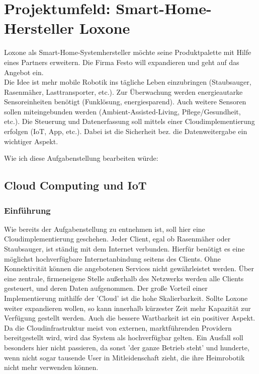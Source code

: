 \documentclass[letterpaper, 12pt]{article}
\let\tempsection\section
\renewcommand\section[1]{\vspace{-0.3cm}\tempsection{#1}\vspace{-0.3cm}}
\let\tempsubsection\subsection
\renewcommand\subsection[1]{\vspace{0cm}\tempsubsection{#1}\vspace{0cm}}
\let\tempsubsubsection\subsubsection
\renewcommand\subsubsection[1]{\vspace{0cm}\tempsubsubsection{#1}\vspace{0cm}}
\begin{document}
\clearpage

\section{Projektumfeld: Smart-Home-Hersteller Loxone}

Loxone als Smart-Home-Systemhersteller möchte seine Produktpalette mit
Hilfe eines Partners erweitern. Die Firma Festo will expandieren und
geht auf das Angebot ein. \\
Die Idee ist mehr mobile Robotik ins tägliche Leben einzubringen
(Staubsauger, Rasenmäher, Lasttransporter, etc.). Zur Überwachung werden
energieautarke Sensoreinheiten benötigt (Funklösung, energiesparend).
Auch weitere Sensoren sollen miteingebunden werden
(Ambient-Assisted-Living, Pflege/Gesundheit, etc.).
Die Steuerung und Datenerfassung soll mittels einer Cloudimplementierung
erfolgen (IoT, App, etc.).
Dabei ist die Sicherheit bez. die Datenweitergabe ein wichtiger Aspekt.

Wie ich diese Aufgabenstellung bearbeiten würde:

\subsection{Cloud Computing und IoT}

\subsubsection{Einführung}

Wie bereits der Aufgabenstellung zu entnehmen ist, soll hier eine Cloudimplementierung geschehen. Jeder Client, egal ob Rasenmäher oder Staubsauger, ist ständig mit dem Internet verbunden. Hierfür benötigt es eine möglichst hochverfügbare Internetanbindung seitens des Clients. Ohne Konnektivität können die angebotenen Services nicht gewährleistet werden. Über eine zentrale, firmeneigene Stelle außerhalb des Netzwerks werden alle Clients gesteuert, und deren Daten aufgenommen. Der große Vorteil einer Implementierung mithilfe der 'Cloud' ist die hohe Skalierbarkeit. Sollte Loxone weiter expandieren wollen, so kann innerhalb kürzester Zeit mehr Kapazität zur Verfügung gestellt werden. Auch die bessere Wartbarkeit ist ein positiver Aspekt. Da die Cloudinfrastruktur meist von externen, marktführenden Providern bereitgestellt wird, wird das System als hochverfügbar gelten. Ein Ausfall soll besonders hier nicht passieren, da sonst 'der ganze Betrieb steht' und hunderte, wenn nicht sogar tausende User in Mitleidenschaft zieht, die ihre Heimrobotik nicht mehr verwenden können.
\end{document}
